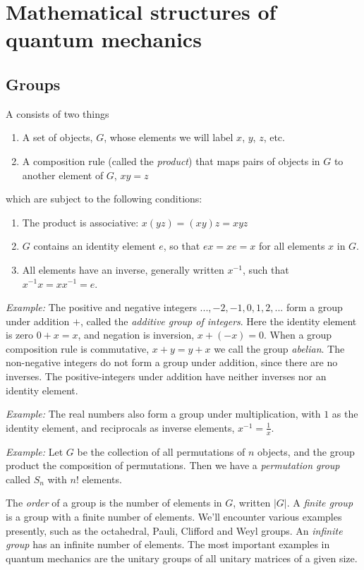 

\clearpage

\section{Mathematical structures of quantum mechanics}


\subsection{Groups}
 A  consists of two things
 \begin{enumerate}
\item A set of objects, $G$, whose elements we will label $x$, $y$, $z$, etc.
\item A composition rule (called the {\sl product}) that maps pairs of objects in $G$ to another element of $G$, $xy=z$
\end{enumerate}
which are subject to the following conditions:
\begin{enumerate}
\item The product is associative: $x(yz)= (xy)z= xyz$
\item $G$ contains an identity element $e$, so that $ex=xe=x$ for all elements $x$ in $G$.
\item All elements have an inverse, generally written $x^{-1}$, such that $x^{-1}x = x x^{-1} = e$.
\end{enumerate}

{\sl Example:} The positive and negative integers $..., -2, -1, 0, 1, 2, ...$ form a group under addition $+$, called the {\sl additive group of integers}. Here the identity element is zero $0+x=x$, and negation is inversion, $x+(-x) = 0$. When a group composition rule is commutative, $x+y = y+x$ we call the group {\sl abelian}.
The non-negative integers do not form a group under addition, since there are no inverses. The positive-integers under addition have neither inverses nor an identity element.


{\sl Example:} The real numbers also form a group under multiplication, with $1$ as the identity element, and reciprocals as inverse elements, $x^{-1} = \tfrac{1}{x}$.

{\sl Example:} Let $G$ be the collection of all permutations of $n$ objects, and the group product the composition of permutations. Then we have a {\sl permutation group} called $S_n$ with $n!$ elements.
 
The {\sl order} of a group is the number of elements in $G$, written $|G|$. A {\sl finite group} is a group with a finite number of elements. We'll encounter various examples presently, such as the octahedral, Pauli, Clifford and Weyl groups. An {\sl infinite group} has an infinite number of elements. The most important examples in quantum mechanics are the unitary groups of all unitary matrices of a given size.

